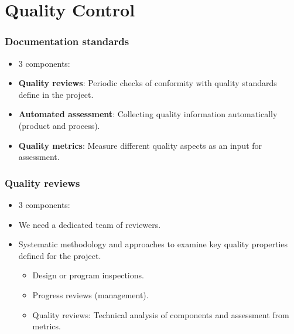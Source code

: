 \documentclass{beamer}
\begin{document}

\section{Quality Control}


\begin{frame}
 \frametitle{Documentation standards}
 \begin{itemize}
 \item 3 components:
 \item \textbf{Quality reviews}: Periodic checks of conformity with quality standards define in the project.
 \item \textbf{Automated assessment}: Collecting quality information automatically (product and process).
 \item \textbf{Quality metrics}: Measure different quality aspects as an input for assessment.
 \end{itemize}
\end{frame}


\begin{frame}
 \frametitle{Quality reviews}
 \begin{itemize}
 \item 3 components:
 \item We need a dedicated team of reviewers.
 \item Systematic methodology and approaches to examine key quality properties defined for the project.
 \begin{itemize}
  \item Design or program inspections.
  \item Progress reviews (management).
  \item Quality reviews: Technical analysis of components and assessment from metrics.
 \end{itemize}

 \end{itemize}
\end{frame}

\end{document}
